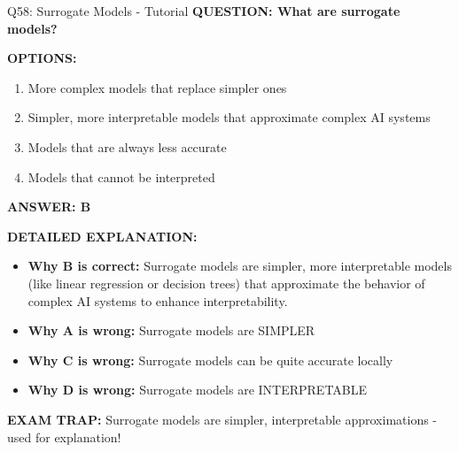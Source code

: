 \documentclass[8pt]{beamer}
\begin{document}
	\begin{frame}{Q58: Surrogate Models - Tutorial}
		\fontsize{6.5}{7.5}\selectfont
		\textbf{QUESTION: What are surrogate models?}
		
		\vspace{0.1cm}
		\textbf{OPTIONS:}
		\begin{enumerate}
			\item More complex models that replace simpler ones
			\item Simpler, more interpretable models that approximate complex AI systems
			\item Models that are always less accurate
			\item Models that cannot be interpreted
		\end{enumerate}
		
		\vspace{0.1cm}
		\textcolor{myblue}{\textbf{ANSWER: B}}
		
		\vspace{0.1cm}
		\textbf{DETAILED EXPLANATION:}
		\begin{itemize}
			\item \textbf{Why B is correct:} Surrogate models are simpler, more interpretable models (like linear regression or decision trees) that approximate the behavior of complex AI systems to enhance interpretability.
			\item \textbf{Why A is wrong:} Surrogate models are SIMPLER
			\item \textbf{Why C is wrong:} Surrogate models can be quite accurate locally
			\item \textbf{Why D is wrong:} Surrogate models are INTERPRETABLE
		\end{itemize}
		
		\textcolor{myred}{\textbf{EXAM TRAP:}} Surrogate models are \textcolor{myblue}{simpler, interpretable approximations} - used for explanation!
	\end{frame}
	
\end{document}
